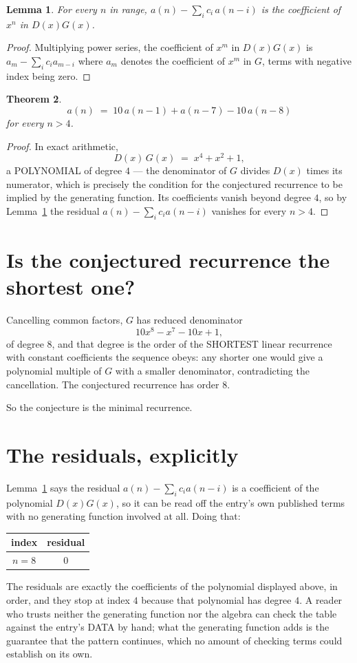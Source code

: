 \documentclass[11pt,a4paper]{article}
\theoremstyle{plain}
\newtheorem{theorem}{Theorem}
\newtheorem{lemma}[theorem]{Lemma}
\theoremstyle{definition}
\begin{document}
\begin{lemma}\label{lem:key}
For every $n$ in range, $a(n)-\sum_i c_i\,a(n-i)$ is the coefficient of $x^{n}$ in
$D(x)G(x)$.
\end{lemma}

\begin{proof}
Multiplying power series, the coefficient of $x^{m}$ in $D(x)G(x)$ is
$a_m-\sum_i c_i a_{m-i}$ where $a_m$ denotes the coefficient of $x^{m}$ in $G$, terms with
negative index being zero.
\end{proof}

\begin{theorem}
\[
a(n)\;=\;10\,a(n-1) + a(n-7) - 10\,a(n-8)
\]
for every $n>4$.
\end{theorem}

\begin{proof}
In exact arithmetic,
\[
D(x)\,G(x)\;=\;x^{4} + x^{2} + 1,
\]
a POLYNOMIAL of degree $4$ --- the denominator of $G$ divides $D(x)$ times its numerator,
which is precisely the condition for the conjectured recurrence to be implied by the
generating function. Its coefficients vanish beyond degree $4$, so by
Lemma~\ref{lem:key} the residual $a(n)-\sum_ic_ia(n-i)$ vanishes for every
$n>4$.
\end{proof}

\section{Is the conjectured recurrence the shortest one?}

Cancelling common factors, $G$ has reduced denominator
\[
10 x^{8} - x^{7} - 10 x + 1,
\]
of degree $8$, and that degree is the order of the SHORTEST linear recurrence with
constant coefficients the sequence obeys: any shorter one would give a polynomial multiple of
$G$ with a smaller denominator, contradicting the cancellation. The conjectured recurrence has
order $8$.

So the conjecture is the minimal recurrence.

\section{The residuals, explicitly}

Lemma~\ref{lem:key} says the residual $a(n)-\sum_ic_ia(n-i)$ is a coefficient of the
polynomial $D(x)G(x)$, so it can be read off the entry's own published terms with no
generating function involved at all. Doing that:
\begin{center}
\begin{tabular}{cc}
index & residual \\ \hline
$n=8$ & $0$
\end{tabular}
\end{center}
The residuals are exactly the coefficients of the polynomial displayed above, in order, and
they stop at index $4$ because that polynomial has degree $4$. A reader who trusts
neither the generating function nor the algebra can check the table against the entry's DATA
by hand; what the generating function adds is the guarantee that the pattern continues, which
no amount of checking terms could establish on its own.
\end{document}
